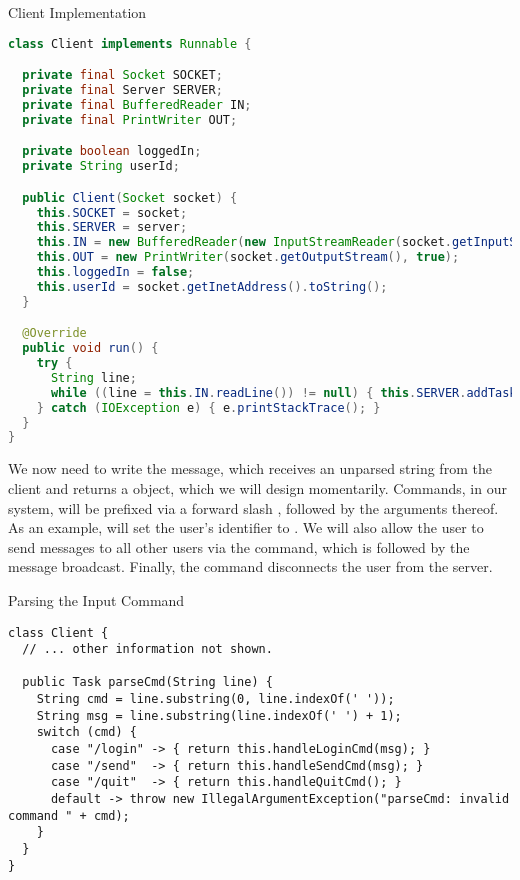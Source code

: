 \begin{cl}{Client Implementation}
\begin{lstlisting}[language=Java]
class Client implements Runnable {

  private final Socket SOCKET;
  private final Server SERVER;
  private final BufferedReader IN;
  private final PrintWriter OUT;

  private boolean loggedIn;
  private String userId;

  public Client(Socket socket) {
    this.SOCKET = socket;
    this.SERVER = server;
    this.IN = new BufferedReader(new InputStreamReader(socket.getInputStream()));
    this.OUT = new PrintWriter(socket.getOutputStream(), true);
    this.loggedIn = false;
    this.userId = socket.getInetAddress().toString();
  }

  @Override
  public void run() {
    try {
      String line;
      while ((line = this.IN.readLine()) != null) { this.SERVER.addTask(parseCmd(line)); }
    } catch (IOException e) { e.printStackTrace(); }
  }
}
\end{lstlisting}
\end{cl}

We now need to write the  message, which receives an unparsed string from the client and returns a  object, which we will design momentarily. Commands, in our system, will be prefixed via a forward slash \ttt{/}, followed by the arguments thereof. As an example,  will set the user's identifier to . We will also allow the user to send messages to all other users via the  command, which is followed by the message broadcast. Finally, the  command disconnects the user from the server.

\begin{cl}{Parsing the Input Command}
\begin{lstlisting}[language=MyJava]
class Client {
  // ... other information not shown.

  public Task parseCmd(String line) {
    String cmd = line.substring(0, line.indexOf(' '));
    String msg = line.substring(line.indexOf(' ') + 1);
    switch (cmd) {
      case "/login" -> { return this.handleLoginCmd(msg); }
      case "/send"  -> { return this.handleSendCmd(msg); }
      case "/quit"  -> { return this.handleQuitCmd(); }
      default -> throw new IllegalArgumentException("parseCmd: invalid command " + cmd);
    }
  }
}
\end{lstlisting}
\end{cl}

